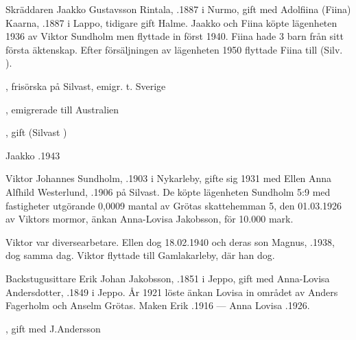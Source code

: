 %
Skräddaren Jaakko Gustavsson Rintala, .1887 i Nurmo, gift med Adolfiina (Fiina) Kaarna, .1887 i Lappo, tidigare gift Halme. Jaakko och Fiina  köpte lägenheten 1936 av Viktor Sundholm men flyttade in först 1940. Fiina hade 3 barn från sitt första äktenskap. Efter försäljningen av lägenheten 1950 flyttade Fiina till (Silv.     ).
\begin{jhchildren}
  \item {}, frisörska på Silvast, emigr. t. Sverige
  \item {}, emigrerade till Australien
  \item {}, gift (Silvast      )
\end{jhchildren}
Jaakko .1943

%
Viktor Johannes Sundholm, .1903 i Nykarleby, gifte sig 1931 med Ellen Anna Alfhild Westerlund, .1906 på Silvast. De köpte lägenheten Sundholm 5:9 med fastigheter utgörande 0,0009 mantal av Grötas skattehemman 5, den 01.03.1926 av Viktors mormor, änkan Anna-Lovisa Jakobsson, för 10.000 mark.

Viktor var diversearbetare. Ellen dog 18.02.1940 och deras son Magnus, .1938, dog samma dag. Viktor flyttade till Gamlakarleby, där han dog.


%
Backstugusittare Erik Johan Jakobsson, .1851 i Jeppo, gift med Anna-Lovisa Andersdotter, .1849 i Jeppo. År 1921 löste änkan Lovisa in området av Anders Fagerholm och Anselm Grötas.
Maken Erik .1916  ---  Anna Lovisa .1926.
\begin{jhchildren}
  \item {}
  \item {}, gift med J.Andersson
  \item {}
  \item {}
  \item {}
\end{jhchildren}

